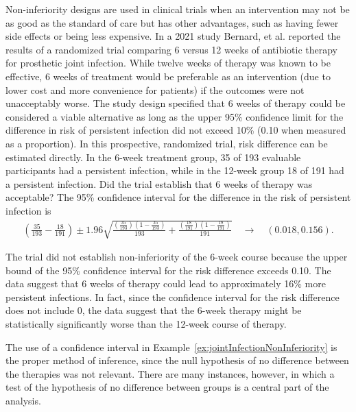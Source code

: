 \begin{examplewrap}
  \begin{nexample}{Non-inferiority designs are used in clinical trials when an intervention may not be as good as the standard of care but has other advantages, such as having fewer side effects or being less expensive. In a 2021 study Bernard, et al.  reported the results of a randomized trial comparing 6 versus 12 weeks of antibiotic therapy for prosthetic joint infection. While twelve weeks of therapy was known to be effective, 6 weeks of treatment would be preferable as an intervention (due to lower cost and more convenience for patients) if the outcomes were not unacceptably worse. The study design specified that 6 weeks of therapy could be considered a viable alternative as long as the upper 95\% confidence limit for the difference in risk of persistent infection did not exceed 10\% (0.10 when measured as a proportion). In this prospective, randomized trial, risk difference can be estimated directly. In the 6-week treatment group, 35 of 193 evaluable participants had a persistent infection, while in the 12-week group 18 of 191 had a persistent infection.  Did the trial establish that 6 weeks of therapy was acceptable?}\label{ex:jointInfectionNonInferiority}
The 95\% confidence interval for the difference in the risk of persistent infection is
\begin{align*}
   \left( \frac{35}{193} - \frac{18}{191} \right) \pm 1.96  \sqrt{\frac{(\frac{35}{193} )(1 - \frac{35}{193} )}{193}
   + \frac{(\frac{18}{191})(1 - \frac{18}{191})}{191}} \quad \to \quad (0.018, 0.156).
\end{align*}

The trial did not establish non-inferiority of the 6-week course because the upper bound of the 95\% confidence interval for the risk difference exceeds 0.10.  The data suggest that 6 weeks of therapy could lead to approximately 16\% more persistent infections. In fact, since the confidence interval for the risk difference does not include 0, the data suggest that the 6-week therapy might be statistically significantly worse than the 12-week course of therapy.

\end{nexample}
\end{examplewrap}

The use of a confidence interval in Example~\ref{ex:jointInfectionNonInferiority} is the proper method of inference, since the null hypothesis of no difference between the therapies was not relevant.  There are many instances, however, in which a test of the hypothesis of no difference between groups is a central part of the analysis.

